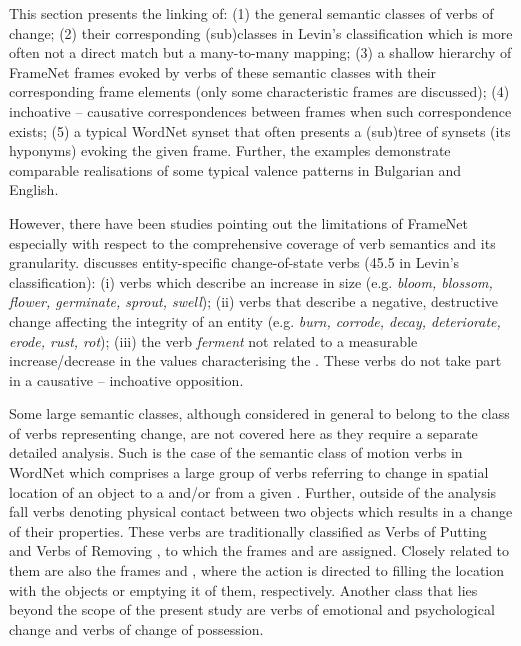 \documentclass[output=paper,colorlinks,citecolor=brown]{langscibook}
\begin{document}
This section presents the linking of: (1) the general semantic classes of verbs of change; (2) their corresponding (sub)classes in Levin's classification \citep{Levin1993} which is more often not a direct match but a many-to-many mapping; (3) a shallow hierarchy of FrameNet frames evoked by verbs of these semantic classes with their corresponding frame elements (only some characteristic frames are discussed); (4) inchoative -- causative correspondences between frames when such correspondence exists; (5) a typical WordNet synset that often presents a (sub)tree of synsets (its hyponyms) evoking the given frame. Further, the examples demonstrate comparable realisations of some typical valence patterns in Bulgarian and English.

However, there have been studies pointing out the limitations of FrameNet especially with respect to the comprehensive coverage of verb semantics and its granularity. \citet{Rosca2013} discusses entity-specific change-of-state verbs (45.5 in Levin's classification): (i) verbs which describe an increase in size (e.g. \textit{bloom, blossom, flower, germinate, sprout, swell}); (ii) verbs that describe a negative, destructive change affecting the integrity of an entity (e.g. \textit{burn, corrode, decay, deteriorate, erode, rust, rot}); (iii) the verb \textit{ferment} not related to a measurable increase\slash decrease in the values characterising the . These verbs do not take part in a causative -- inchoative opposition. 

Some large semantic classes, although considered in general to belong to the class of verbs representing change, are not covered here as they require a separate detailed analysis. Such is the case of the semantic class of motion verbs in WordNet which comprises a large group of verbs referring to change in spatial location of an object to a  and/or from a given . Further, outside of the analysis fall verbs denoting physical contact between two objects which results in a change of their properties. These verbs are traditionally classified as Verbs of Putting and Verbs of Removing \citep[111--131]{Levin1993}, to which the frames  and  are assigned. Closely related to them are also the frames  and , where the action is directed to filling the location with the objects or emptying it of them, respectively. Another class that lies beyond the scope of the present study are verbs of emotional and psychological change and verbs of change of possession.
\end{document}
